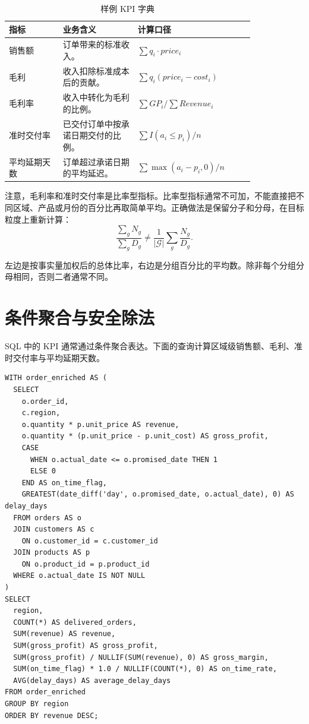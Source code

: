 \documentclass[UTF8,fontset=fandol,openany,zihao=-4]{ctexbook}
\begin{document}
\begin{table}[htbp]
\centering
\caption{样例 KPI 字典}
\begin{tabular}{p{0.18\linewidth}p{0.25\linewidth}p{0.39\linewidth}}
\toprule
指标 & 业务含义 & 计算口径\\
\midrule
销售额 & 订单带来的标准收入。 & \(\sum q_i \cdot price_i\)\\
毛利 & 收入扣除标准成本后的贡献。 & \(\sum q_i(price_i-cost_i)\)\\
毛利率 & 收入中转化为毛利的比例。 & \(\sum GP_i / \sum Revenue_i\)\\
准时交付率 & 已交付订单中按承诺日期交付的比例。 & \(\sum I(a_i\le p_i)/n\)\\
平均延期天数 & 订单超过承诺日期的平均延迟。 & \(\sum \max(a_i-p_i,0)/n\)\\
\bottomrule
\end{tabular}
\end{table}

注意，毛利率和准时交付率是比率型指标。比率型指标通常不可加，不能直接把不同区域、产品或月份的百分比再取简单平均。正确做法是保留分子和分母，在目标粒度上重新计算：
\[
\frac{\sum_{g}N_g}{\sum_{g}D_g}
\ne
\frac{1}{|\mathcal G|}\sum_g\frac{N_g}{D_g}.
\]

\begin{remark}
左边是按事实量加权后的总体比率，右边是分组百分比的平均数。除非每个分组分母相同，否则二者通常不同。
\end{remark}

\section{条件聚合与安全除法}

SQL 中的 KPI 通常通过条件聚合表达。下面的查询计算区域级销售额、毛利、准时交付率与平均延期天数。

\begin{lstlisting}[caption={区域级运营 KPI 查询}]
WITH order_enriched AS (
  SELECT
    o.order_id,
    c.region,
    o.quantity * p.unit_price AS revenue,
    o.quantity * (p.unit_price - p.unit_cost) AS gross_profit,
    CASE
      WHEN o.actual_date <= o.promised_date THEN 1
      ELSE 0
    END AS on_time_flag,
    GREATEST(date_diff('day', o.promised_date, o.actual_date), 0) AS delay_days
  FROM orders AS o
  JOIN customers AS c
    ON o.customer_id = c.customer_id
  JOIN products AS p
    ON o.product_id = p.product_id
  WHERE o.actual_date IS NOT NULL
)
SELECT
  region,
  COUNT(*) AS delivered_orders,
  SUM(revenue) AS revenue,
  SUM(gross_profit) AS gross_profit,
  SUM(gross_profit) / NULLIF(SUM(revenue), 0) AS gross_margin,
  SUM(on_time_flag) * 1.0 / NULLIF(COUNT(*), 0) AS on_time_rate,
  AVG(delay_days) AS average_delay_days
FROM order_enriched
GROUP BY region
ORDER BY revenue DESC;
\end{lstlisting}
\end{document}

